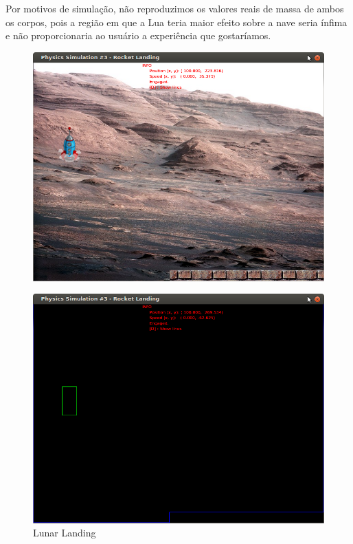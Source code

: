 Por motivos de simulação, não reproduzimos os valores reais de massa de ambos os corpos, pois a região em que a Lua teria maior efeito sobre a nave seria ínfima e não proporcionaria ao usuário a experiência que gostaríamos. \\

\begin{figure}[H]
\centering
	\includegraphics[scale=0.4]{images/lunarLanding.png}
\end{figure}
\begin{figure}[H]
\centering
	\includegraphics[scale=0.4]{images/lunarLandingE.png}
	\caption{Lunar Landing}
\end{figure}

